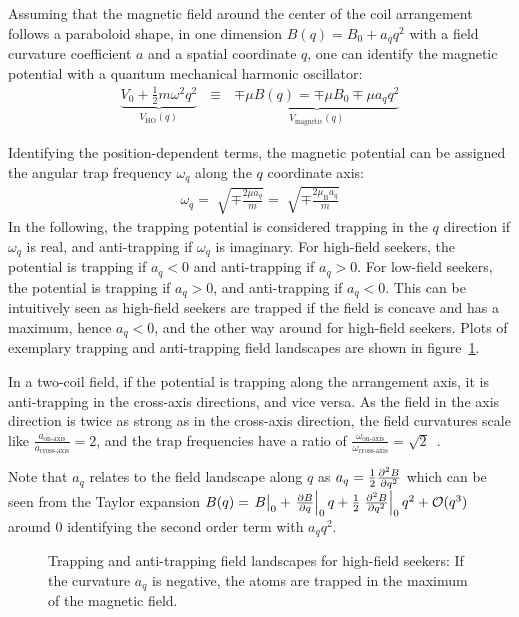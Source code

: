 Assuming that the magnetic field around the center of the coil arrangement follows a paraboloid shape, in one dimension $B(q) = B_0 + a_q q^2$ with a field curvature coefficient $a$ and a spatial coordinate $q$, one can identify the magnetic potential with a quantum mechanical harmonic oscillator:
\begin{align}
    \underbrace{V_0 + \frac{1}{2}m\omega^2q^2}_{V_\text{HO}(q)} ~~~\equiv~~~ \underbrace{\mp \mu B(q) = \mp \mu B_0 \mp \mu a_q q^2}_{V_\text{magnetic}(q)}
\end{align}

Identifying the position-dependent terms, the magnetic potential can be assigned the angular trap frequency $\omega_q$ along the $q$ coordinate axis:
\begin{align}
    \omega_q = \sqrt[]{\mp\frac{2 \mu a_q}{m}} = \sqrt[]{\mp\frac{2 \mu_\text{B} a_q}{m}}
\end{align}
In the following, the trapping potential is considered trapping in the $q$ direction if $\omega_q$ is real, and anti-trapping if $\omega_q$ is imaginary. For high-field seekers, the potential is trapping if $a_q < 0$ and anti-trapping if $a_q > 0$. For low-field seekers, the potential is trapping if $a_q > 0$, and anti-trapping if $a_q < 0$. This can be intuitively seen as high-field seekers are trapped if the field is concave and has a maximum, hence $a_q < 0$, and the other way around for high-field seekers. Plots of exemplary trapping and anti-trapping field landscapes are shown in figure~\ref{fig:magnetic_field_curvature_examples}.

In a two-coil field, if the potential is trapping along the arrangement axis, it is anti-trapping in the cross-axis directions, and vice versa. As the field in the axis direction is twice as strong as in the cross-axis direction, the field curvatures scale like $\frac{a_\text{on-axis}}{a_\text{cross-axis}} = 2$, and the trap frequencies have a ratio of $\frac{\omega_\text{on-axis}}{\omega_\text{cross-axis}} = \sqrt{2}$~\cite{hagemann_setup_2020}.

Note that $a_q$ relates to the field landscape along $q$ as $a_q  = \frac{1}{2} \pdv[2]{B}{q}$ which can be seen from the Taylor expansion $B(q) = \eval{B}_{0} + \eval{\pdv{B}{q}}_{0} q + \frac{1}{2} \eval{\pdv[2]{B}{q}}_{0} q^2 + \mathcal{O}(q^3)$ around $0$ identifying the second order term with $a_q q^2$.

\begin{figure}
    \caption{Trapping and anti-trapping field landscapes for high-field seekers: If the curvature $a_q$ is negative, the atoms are trapped in the maximum of the magnetic field.}
    \label{fig:magnetic_field_curvature_examples}
\end{figure}

